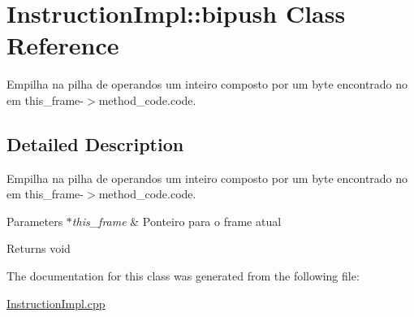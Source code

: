 \hypertarget{class_instruction_impl_1_1bipush}{}\section{Instruction\+Impl\+:\+:bipush Class Reference}
\label{class_instruction_impl_1_1bipush}


Empilha na pilha de operandos um inteiro composto por um byte encontrado no em this\+\_\+frame-\/$>$method\+\_\+code.\+code.  




\subsection{Detailed Description}
Empilha na pilha de operandos um inteiro composto por um byte encontrado no em this\+\_\+frame-\/$>$method\+\_\+code.\+code. 


\begin{DoxyParams}{Parameters}
{\em $\ast$this\+\_\+frame} & Ponteiro para o frame atual \\
\hline
\end{DoxyParams}
\begin{DoxyReturn}{Returns}
void 
\end{DoxyReturn}


The documentation for this class was generated from the following file\+:\begin{DoxyCompactItemize}
\item 
\hyperlink{_instruction_impl_8cpp}{Instruction\+Impl.\+cpp}\end{DoxyCompactItemize}
